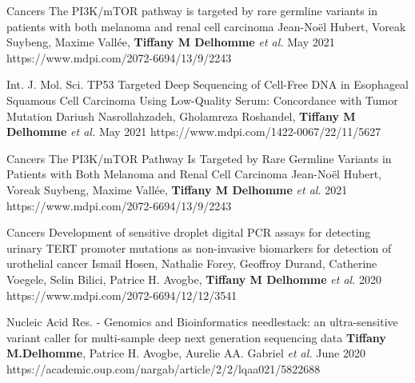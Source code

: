 \begin{cventries}
  
   \cvpublicationentry
   	{Cancers} %
    {The PI3K/mTOR pathway is targeted by rare germline variants in patients with both melanoma and renal cell carcinoma} %
    {Jean-Noël Hubert, Voreak Suybeng, Maxime Vallée, \textbf{Tiffany M Delhomme} \textit{et al.}} %
    {}
    {May 2021} %
    {https://www.mdpi.com/2072-6694/13/9/2243}
    
    \cvpublicationentry
   	{Int. J. Mol. Sci.} %
    {TP53 Targeted Deep Sequencing of Cell-Free DNA in Esophageal Squamous Cell Carcinoma Using Low-Quality Serum: Concordance with Tumor Mutation} %
    {Dariush Nasrollahzadeh, Gholamreza Roshandel, \textbf{Tiffany M Delhomme} \textit{et al.}} %
    {}
    {May 2021} %
    {https://www.mdpi.com/1422-0067/22/11/5627}
    
    \cvpublicationentry
   	{Cancers} %
    {The PI3K/mTOR Pathway Is Targeted by Rare Germline Variants in Patients with Both Melanoma and Renal Cell Carcinoma} %
    {Jean-Noël Hubert, Voreak Suybeng, Maxime Vallée, \textbf{Tiffany M Delhomme} \textit{et al.}} %
    {}
    { 2021} %
    {https://www.mdpi.com/2072-6694/13/9/2243}
    
    \cvpublicationentry
   	{Cancers} %
    {Development of sensitive droplet digital PCR assays for detecting urinary TERT promoter mutations as non-invasive biomarkers for detection of urothelial cancer} %
    {Ismail Hosen, Nathalie Forey, Geoffroy Durand, Catherine Voegele, Selin Bilici, Patrice H. Avogbe, \textbf{Tiffany M Delhomme} \textit{et al.}} %
    {}
    {2020} %
    {https://www.mdpi.com/2072-6694/12/12/3541}
    
    \cvpublicationentry
    {Nucleic Acid Res. - Genomics and Bioinformatics} %
    {needlestack: an ultra-sensitive variant caller for multi-sample deep next generation sequencing data} %
    {\textbf{Tiffany M.Delhomme}, Patrice H. Avogbe, Aurelie AA. Gabriel \textit{et al.}} %
    {}
    {June 2020} %
    {https://academic.oup.com/nargab/article/2/2/lqaa021/5822688}
    

\end{cventries}
